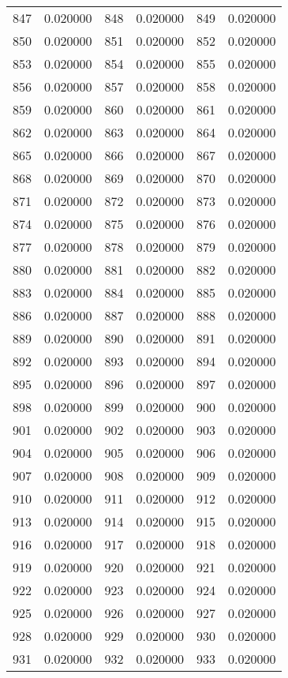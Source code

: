 \documentclass[12pt]{article}
\begin{document}
\begin{longtable}{@{}cc|cc|cc@{}}
847 & 0.020000 & 848 & 0.020000 & 849 & 0.020000 \\
850 & 0.020000 & 851 & 0.020000 & 852 & 0.020000 \\
853 & 0.020000 & 854 & 0.020000 & 855 & 0.020000 \\
856 & 0.020000 & 857 & 0.020000 & 858 & 0.020000 \\
859 & 0.020000 & 860 & 0.020000 & 861 & 0.020000 \\
862 & 0.020000 & 863 & 0.020000 & 864 & 0.020000 \\
865 & 0.020000 & 866 & 0.020000 & 867 & 0.020000 \\
868 & 0.020000 & 869 & 0.020000 & 870 & 0.020000 \\
871 & 0.020000 & 872 & 0.020000 & 873 & 0.020000 \\
874 & 0.020000 & 875 & 0.020000 & 876 & 0.020000 \\
877 & 0.020000 & 878 & 0.020000 & 879 & 0.020000 \\
880 & 0.020000 & 881 & 0.020000 & 882 & 0.020000 \\
883 & 0.020000 & 884 & 0.020000 & 885 & 0.020000 \\
886 & 0.020000 & 887 & 0.020000 & 888 & 0.020000 \\
889 & 0.020000 & 890 & 0.020000 & 891 & 0.020000 \\
892 & 0.020000 & 893 & 0.020000 & 894 & 0.020000 \\
895 & 0.020000 & 896 & 0.020000 & 897 & 0.020000 \\
898 & 0.020000 & 899 & 0.020000 & 900 & 0.020000 \\
901 & 0.020000 & 902 & 0.020000 & 903 & 0.020000 \\
904 & 0.020000 & 905 & 0.020000 & 906 & 0.020000 \\
907 & 0.020000 & 908 & 0.020000 & 909 & 0.020000 \\
910 & 0.020000 & 911 & 0.020000 & 912 & 0.020000 \\
913 & 0.020000 & 914 & 0.020000 & 915 & 0.020000 \\
916 & 0.020000 & 917 & 0.020000 & 918 & 0.020000 \\
919 & 0.020000 & 920 & 0.020000 & 921 & 0.020000 \\
922 & 0.020000 & 923 & 0.020000 & 924 & 0.020000 \\
925 & 0.020000 & 926 & 0.020000 & 927 & 0.020000 \\
928 & 0.020000 & 929 & 0.020000 & 930 & 0.020000 \\
931 & 0.020000 & 932 & 0.020000 & 933 & 0.020000 \\

\end{longtable}
\end{document}

